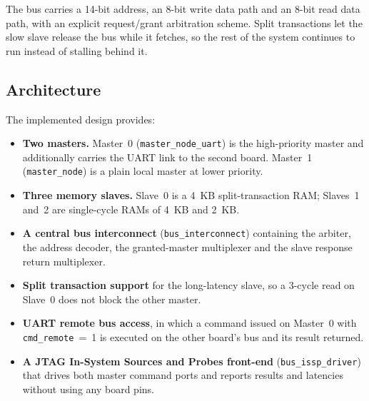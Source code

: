 \documentclass[11pt,a4paper]{article}
\newcommand{\sig}[1]{\texttt{#1}}
\begin{document}
The bus carries a 14-bit address, an 8-bit write data path and an 8-bit read
data path, with an explicit request/grant arbitration scheme. Split transactions
let the slow slave release the bus while it fetches, so the rest of the system
continues to run instead of stalling behind it.

\subsection{Architecture}

The implemented design provides:

\begin{itemize}
    \item \textbf{Two masters.} Master~0 (\sig{master\_node\_uart}) is the
          high-priority master and additionally carries the UART link to the
          second board. Master~1 (\sig{master\_node}) is a plain local master
          at lower priority.
    \item \textbf{Three memory slaves.} Slave~0 is a 4~KB split-transaction
          RAM; Slaves~1 and~2 are single-cycle RAMs of 4~KB and 2~KB.
    \item \textbf{A central bus interconnect} (\sig{bus\_interconnect})
          containing the arbiter, the address decoder, the granted-master
          multiplexer and the slave response return multiplexer.
    \item \textbf{Split transaction support} for the long-latency slave, so a
          3-cycle read on Slave~0 does not block the other master.
    \item \textbf{UART remote bus access}, in which a command issued on
          Master~0 with \sig{cmd\_remote}~=~1 is executed on the other board's
          bus and its result returned.
    \item \textbf{A JTAG In-System Sources and Probes front-end}
          (\sig{bus\_issp\_driver}) that drives both master command ports and
          reports results and latencies without using any board pins.
\end{itemize}
\end{document}
